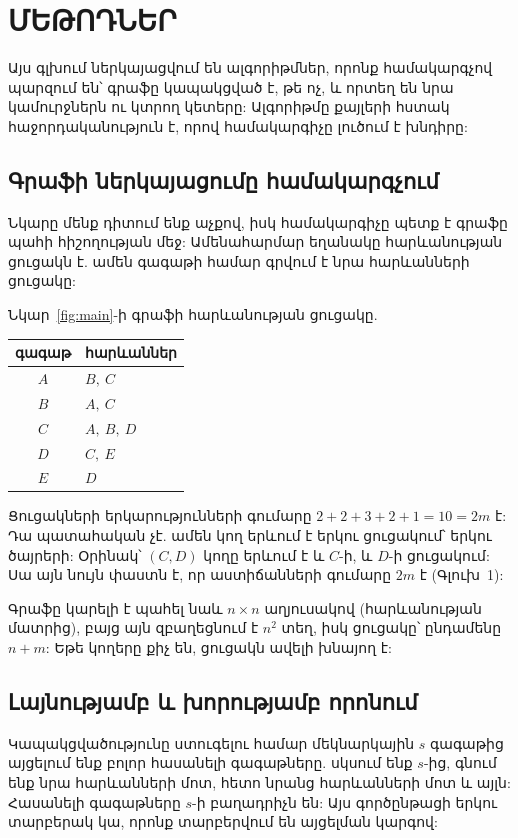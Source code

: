 
\chapter{ՄԵԹՈԴՆԵՐ}

Այս գլխում ներկայացվում են ալգորիթմներ, որոնք համակարգչով պարզում են՝ գրաֆը կապակցված է, թե ոչ, և որտեղ են նրա կամուրջներն ու կտրող կետերը: Ալգորիթմը քայլերի հստակ հաջորդականություն է, որով համակարգիչը լուծում է խնդիրը:

\section{Գրաֆի ներկայացումը համակարգչում}

Նկարը մենք դիտում ենք աչքով, իսկ համակարգիչը պետք է գրաֆը պահի հիշողության մեջ: Ամենահարմար եղանակը հարևանության ցուցակն է. ամեն գագաթի համար գրվում է նրա հարևանների ցուցակը:

\begin{example}
Նկար~\ref{fig:main}-ի գրաֆի հարևանության ցուցակը.
\begin{center}
\begin{tabular}{c|l}
գագաթ & հարևաններ\\
\hline
$A$ & $B,\ C$\\
$B$ & $A,\ C$\\
$C$ & $A,\ B,\ D$\\
$D$ & $C,\ E$\\
$E$ & $D$\\
\end{tabular}
\end{center}
\end{example}

Ցուցակների երկարությունների գումարը $2+2+3+2+1=10=2m$ է: Դա պատահական չէ. ամեն կող երևում է երկու ցուցակում՝ երկու ծայրերի: Օրինակ՝ $(C,D)$ կողը երևում է և $C$-ի, և $D$-ի ցուցակում: Սա այն նույն փաստն է, որ աստիճանների գումարը $2m$ է (Գլուխ~1):

Գրաֆը կարելի է պահել նաև $n\times n$ աղյուսակով (հարևանության մատրից), բայց այն զբաղեցնում է $n^2$ տեղ, իսկ ցուցակը՝ ընդամենը $n+m$: Եթե կողերը քիչ են, ցուցակն ավելի խնայող է:

\section{Լայնությամբ և խորությամբ որոնում}

Կապակցվածությունը ստուգելու համար մեկնարկային $s$ գագաթից այցելում ենք բոլոր հասանելի գագաթները. սկսում ենք $s$-ից, գնում ենք նրա հարևանների մոտ, հետո նրանց հարևանների մոտ և այլն: Հասանելի գագաթները $s$-ի բաղադրիչն են: Այս գործընթացի երկու տարբերակ կա, որոնք տարբերվում են այցելման կարգով:

